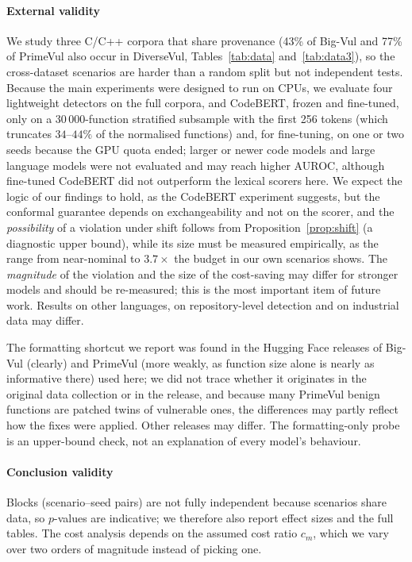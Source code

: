 \paragraph{External validity}
We study three C/C++ corpora that share provenance (43\% of Big-Vul and 77\% of PrimeVul also occur in DiverseVul, Tables~\ref{tab:data} and~\ref{tab:data3}), so the cross-dataset scenarios are harder than a random split but not independent tests. Because the main experiments were designed to run on CPUs, we evaluate four lightweight detectors on the full corpora, and CodeBERT, frozen and fine-tuned, only on a 30\,000-function stratified subsample with the first 256 tokens (which truncates $34$--$44\%$ of the normalised functions) and, for fine-tuning, on one or two seeds because the GPU quota ended; larger or newer code models and large language models were not evaluated and may reach higher AUROC, although fine-tuned CodeBERT did not outperform the lexical scorers here. We expect the logic of our findings to hold, as the CodeBERT experiment suggests, but the conformal guarantee depends on exchangeability and not on the scorer, and the \emph{possibility} of a violation under shift follows from Proposition~\ref{prop:shift} (a diagnostic upper bound), while its size must be measured empirically, as the range from near-nominal to $3.7\times$ the budget in our own scenarios shows. The \emph{magnitude} of the violation and the size of the cost-saving may differ for stronger models and should be re-measured; this is the most important item of future work. Results on other languages, on repository-level detection and on industrial data may differ.

The formatting shortcut we report was found in the Hugging Face releases of Big-Vul (clearly) and PrimeVul (more weakly, as function size alone is nearly as informative there) used here; we did not trace whether it originates in the original data collection or in the release, and because many PrimeVul benign functions are patched twins of vulnerable ones, the differences may partly reflect how the fixes were applied. Other releases may differ. The formatting-only probe is an upper-bound check, not an explanation of every model's behaviour.

\paragraph{Conclusion validity}
Blocks (scenario--seed pairs) are not fully independent because scenarios share data, so $p$-values are indicative; we therefore also report effect sizes and the full tables. The cost analysis depends on the assumed cost ratio $c_m$, which we vary over two orders of magnitude instead of picking one.
